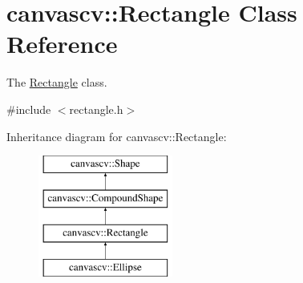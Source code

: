 \hypertarget{classcanvascv_1_1Rectangle}{}\section{canvascv\+:\+:Rectangle Class Reference}
\label{classcanvascv_1_1Rectangle}


The \hyperlink{classcanvascv_1_1Rectangle}{Rectangle} class.  




{\ttfamily \#include $<$rectangle.\+h$>$}

Inheritance diagram for canvascv\+:\+:Rectangle\+:\begin{figure}[H]
\begin{center}
\leavevmode
\includegraphics[height=4.000000cm]{classcanvascv_1_1Rectangle}
\end{center}
\end{figure}
